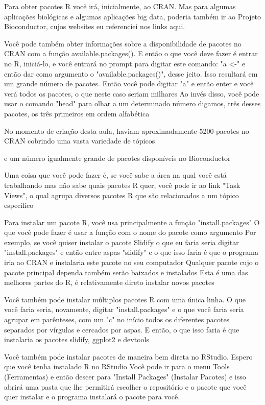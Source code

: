 Para obter pacotes R você irá, inicialmente, ao CRAN. Mas para algumas aplicações biológicas e algumas aplicações big data, poderia também ir ao Projeto Bioconductor, cujos websites eu referenciei nos links aqui. 

Você pode também obter informações sobre a disponibilidade de pacotes no CRAN com a função available.packages(). E então o que você deve fazer é entrar no R, iniciá-lo, e você entrará no prompt para digitar este comando: "a <-" e então dar como argumento o "available.packages()", desse jeito. Isso resultará em um grande número de pacotes. Então você pode digitar "a" e então enter e você verá todos os pacotes, o que neste caso seriam milhares Ao invés disso, você pode usar o comando "head" para olhar a um determinado número digamos, três desses pacotes, os três primeiros em ordem alfabética 

No momento de criação desta aula, haviam aproximadamente 5200 pacotes no CRAN cobrindo uma vasta variedade de tópicos 

e um número igualmente grande de pacotes disponíveis no Bioconductor 

Uma coisa que você pode fazer é, se você sabe a área na qual você está trabalhando mas não sabe quais pacotes R quer, você pode ir ao link "Task Views", o qual agrupa diversos pacotes R que são relacionados a um tópico específico 

Para instalar um pacote R, você usa principalmente a função "install.packages" O que você pode fazer é usar a função com o nome do pacote como argumento Por exemplo, se você quiser instalar o pacote Slidify o que eu faria seria digitar "install.packages" e então entre aspas "slidify" e o que isso faria é que o programa iria ao CRAN e instalaria este pacote no seu computador Qualquer pacote cujo o pacote principal dependa também serão baixados e instalados Esta é uma das melhores partes do R, é relativamente direto instalar novos pacotes 

Você também pode instalar múltiplos pacotes R com uma única linha. O que você faria seria, novamente, digitar "install.packages" e o que você faria seria agrupar em parênteses, com um "c" no início todos os diferentes pacotes separados por vírgulas e cercados por aspas. E então, o que isso faria é que instalaria os pacotes slidify, ggplot2 e devtools 

Você também pode instalar pacotes de maneira bem direta no RStudio. Espero que você tenha instalado R no RStudio Você pode ir para o menu Tools (Ferramentas) e então descer para  "Install Packages" (Instalar Pacotes) e isso abrirá uma pasta que lhe permitirá escolher o repositório e o pacote que você quer instalar e o programa instalará o pacote para você. 

